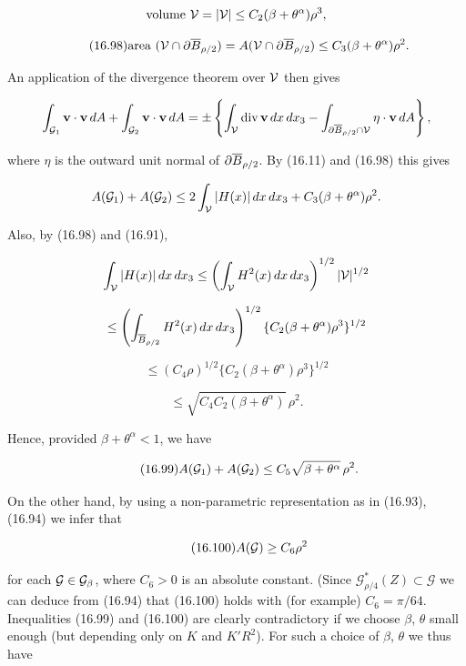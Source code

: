 \[
\text{volume }\mathcal{V} = |\mathcal{V}|\le C_2(\beta+\theta^\alpha)\rho^3,
\]

\begin{equation}
\tag{16.98}
\text{area }(\mathcal{V}\cap \partial \overline{B}_{\rho/2}) = A(\mathcal{V}\cap \partial \overline{B}_{\rho/2})
\le C_3(\beta+\theta^\alpha)\rho^2.
\end{equation}

An application of the divergence theorem over $\mathcal{V}$ then gives

\[
\int_{\mathcal{G}_1}\mathbf{v}\cdot\mathbf{v}\,dA+\int_{\mathcal{G}_2}\mathbf{v}\cdot\mathbf{v}\,dA
= \pm\left\{\int_{\mathcal{V}}\operatorname{div}\mathbf{v}\,dx\,dx_3
-\int_{\partial \overline{B}_{\rho/2}\cap\mathcal{V}}\eta\cdot\mathbf{v}\,dA\right\},
\]

where $\eta$ is the outward unit normal of $\partial \overline{B}_{\rho/2}$. By (16.11) and (16.98) this gives

\[
A(\mathcal{G}_1)+A(\mathcal{G}_2)\le 2\int_{\mathcal{V}}|H(x)|\,dx\,dx_3+C_3(\beta+\theta^\alpha)\rho^2.
\]

Also, by (16.98) and (16.91),

\[
\int_{\mathcal{V}}|H(x)|\,dx\,dx_3
\le \left(\int_{\mathcal{V}}H^2(x)\,dx\,dx_3\right)^{1/2}|\mathcal{V}|^{1/2}
\]

\[
\le \left(\int_{\overline{B}_{\rho/2}}H^2(x)\,dx\,dx_3\right)^{1/2}\{C_2(\beta+\theta^\alpha)\rho^3\}^{1/2}
\]

\[
\le (C_4\rho)^{1/2}\{C_2(\beta+\theta^\alpha)\rho^3\}^{1/2}
\]

\[
\le \sqrt{C_4C_2(\beta+\theta^\alpha)}\,\rho^2.
\]

Hence, provided $\beta+\theta^\alpha<1$, we have

\begin{equation}
\tag{16.99}
A(\mathcal{G}_1)+A(\mathcal{G}_2)\le C_5\sqrt{\beta+\theta^\alpha}\,\rho^2.
\end{equation}

On the other hand, by using a non-parametric representation as in (16.93),
(16.94) we infer that

\begin{equation}
\tag{16.100}
A(\mathcal{G})\ge C_6\rho^2
\end{equation}



\pagestyle{empty}



for each $\mathcal{G}\in\mathcal{G}_\beta$, where $C_6>0$ is an absolute constant. (Since
$\mathscr{G}^*_{\rho/4}(Z)\subset\mathcal{G}$ we can deduce from (16.94) that (16.100)
holds with (for example) $C_6=\pi/64$. Inequalities (16.99) and (16.100) are clearly
contradictory if we choose $\beta$, $\theta$ small enough (but depending only on
$K$ and $K'R^2$). For such a choice of $\beta$, $\theta$ we thus have

